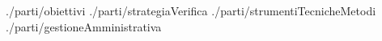 \documentclass[a4paper,12pt]{article}
\title{\titoloDoc}
\newcommand{\parti}{./parti/}
\newcommand{\temp}{../Template/}
\begin{document}
	\newpage
	\newpage
	\tableofcontents %
	\newpage
	\newpage
	
	\newpage
	 {\parti obiettivi}
	\newpage
	 {\parti strategiaVerifica}
	\newpage
	 {\parti strumentiTecnicheMetodi}
	\newpage
	 {\parti gestioneAmministrativa}
\end{document}
